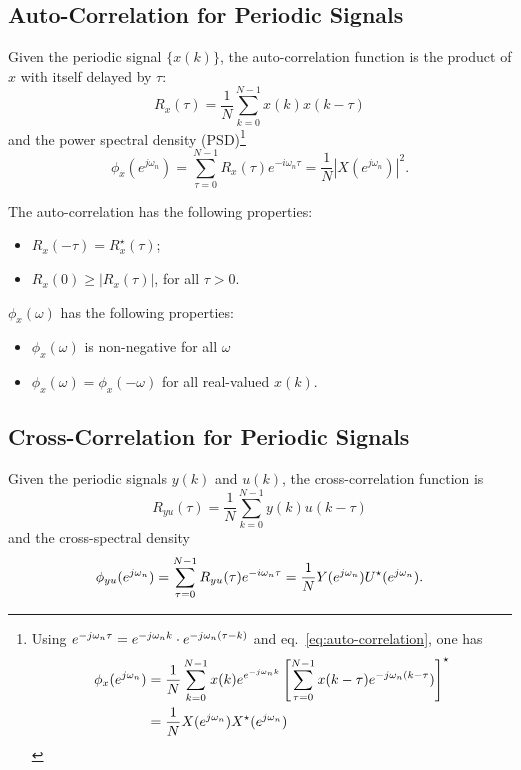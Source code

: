 \subsection{Auto-Correlation for Periodic Signals}
\label{sec:autocorrelation-periodic}

Given the periodic signal $\{x(k)\}$, the auto-correlation function is the product of $x$ with itself delayed by $\tau$:
\begin{equation}
  \label{eq:auto-correlation}
  R_x(\tau) = \frac{1}{N}\sum_{k=0}^{N-1} x(k)x(k-\tau)
\end{equation}
and the power spectral density (PSD)\footnote{Using $\emjwn[\tau] = \emjwn[k]\cdot \emjwn[(\tau-k)]$ and eq.~\eqref{eq:auto-correlation}, one has
  \begin{align*}
    \phi_x(\ejwn) &= \frac{1}{N}\sum_{k=0}^{N-1} x(k)e^{\emjwn[k]} \left[\sum_{\tau=0}^{N-1} x(k-\tau)\emjwn[(k-\tau])\right]^\star \\
                  &= \frac{1}{N}X(\ejwn) X^\star(\ejwn)
  \end{align*}
}
\begin{equation}
  \label{eq:PSD}
  \phi_x(e^{j\omega_n}) = \sum_{\tau=0}^{N-1} R_x(\tau) e^{-i\omega_n\tau} = \frac{1}{N}|X(e^{j\omega_n})|^2.
\end{equation}

The auto-correlation has the following properties:
\begin{itemize}
\item $R_x(-\tau) = R_x^\star(\tau)$;
\item $R_x(0)\ge |R_x(\tau)|$, for all $\tau>0$.
\end{itemize}
$\phi_x(\omega)$ has the following properties:
\begin{itemize}
\item $\phi_x(\omega)$ is non-negative for all $\omega$
\item $\phi_x(\omega) = \phi_x(-\omega)$ for all real-valued $x(k)$.
\end{itemize}

\subsection{Cross-Correlation for Periodic Signals}
\label{sec:crosscorrelation-periodic-signals}

Given the periodic signals $y(k)$ and $u(k)$, the cross-correlation function is
\begin{equation}
  \label{eq:cross-correlation}
  R_{yu}(\tau) = \frac{1}{N}\sum_{k=0}^{N-1} y(k)u(k-\tau)
\end{equation}
and the cross-spectral density
\begin{equation}
  \label{eq:cross-correlation-PSD}
  \phi_{yu}(\ejwn) = \sum_{\tau=0}^{N-1} R_{yu}(\tau) e^{-i\omega_n\tau} = \frac{1}{N}Y(\ejwn)U^\star(\ejwn).
\end{equation}


